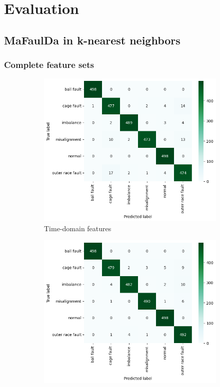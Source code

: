 \chapter{Evaluation} \label{chapter:evaluation} 


\section{MaFaulDa in k-nearest neighbors}

\subsection{Complete feature sets}
\begin{figure}[h]
    \centering
    \begin{subfigure}[b]{0.49\textwidth}
        \includegraphics[width=\textwidth]{assets/results/all-features/TD-confusion-matrix.png}
        \caption{Time-domain features}
    \end{subfigure}
    \hfill
    \begin{subfigure}[b]{0.49\textwidth}
        \includegraphics[width=\textwidth]{assets/results/all-features/FD-confusion-matrix.png}

\end{subfigure}
\end{figure}
